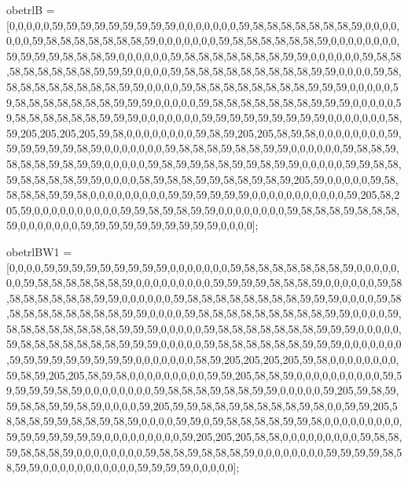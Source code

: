 obetrlB = [0,0,0,0,0,59,59,59,59,59,59,59,59,59,0,0,0,0,0,0,0,59,58,58,58,58,58,58,58,59,0,0,0,0,0,0,0,59,58,58,58,58,58,58,58,59,0,0,0,0,0,0,0,59,58,58,58,58,58,58,59,0,0,0,0,0,0,0,0,59,59,59,59,58,58,58,59,0,0,0,0,0,0,59,58,58,58,58,58,58,58,59,59,0,0,0,0,0,0,59,58,58,58,58,58,58,58,58,59,59,59,0,0,0,0,59,58,58,58,58,58,58,58,58,58,59,59,0,0,0,0,59,58,58,58,58,58,58,58,58,58,59,59,0,0,0,0,59,58,58,58,58,58,58,58,58,59,59,59,0,0,0,0,0,59,58,58,58,58,58,58,58,59,59,59,0,0,0,0,0,59,58,58,58,58,58,58,58,59,59,59,0,0,0,0,0,59,58,58,58,58,58,58,59,59,59,0,0,0,0,0,0,0,59,59,59,59,59,59,59,59,59,0,0,0,0,0,0,0,58,59,205,205,205,205,59,58,0,0,0,0,0,0,0,0,59,58,59,205,205,58,59,58,0,0,0,0,0,0,0,0,59,59,59,59,59,59,58,59,0,0,0,0,0,0,0,59,58,58,58,59,58,58,59,59,0,0,0,0,0,0,59,58,58,59,58,58,58,59,58,59,59,0,0,0,0,0,59,58,59,59,58,58,59,59,58,59,59,0,0,0,0,0,59,59,58,58,59,58,58,58,58,59,59,0,0,0,0,58,59,58,58,59,59,58,58,59,58,59,205,59,0,0,0,0,0,59,58,58,58,58,59,59,58,0,0,0,0,0,0,0,0,0,59,59,59,59,59,59,0,0,0,0,0,0,0,0,0,0,0,59,205,58,205,59,0,0,0,0,0,0,0,0,0,0,59,59,58,59,58,59,59,0,0,0,0,0,0,0,0,59,58,58,58,59,58,58,58,59,0,0,0,0,0,0,0,59,59,59,59,59,59,59,59,59,59,0,0,0,0];

obetrlBW1 = [0,0,0,0,59,59,59,59,59,59,59,59,59,0,0,0,0,0,0,0,59,58,58,58,58,58,58,58,59,0,0,0,0,0,0,0,59,58,58,58,58,58,58,59,0,0,0,0,0,0,0,0,0,59,59,59,59,58,58,58,59,0,0,0,0,0,0,59,58,58,58,58,58,58,58,59,59,0,0,0,0,0,0,59,58,58,58,58,58,58,58,58,59,59,59,0,0,0,0,59,58,58,58,58,58,58,58,58,58,59,59,0,0,0,0,59,58,58,58,58,58,58,58,58,58,59,59,0,0,0,0,59,58,58,58,58,58,58,58,58,59,59,59,0,0,0,0,0,59,58,58,58,58,58,58,58,59,59,59,0,0,0,0,0,59,58,58,58,58,58,58,58,59,59,59,0,0,0,0,0,59,58,58,58,58,58,58,59,59,59,0,0,0,0,0,0,0,59,59,59,59,59,59,59,59,59,0,0,0,0,0,0,0,58,59,205,205,205,205,59,58,0,0,0,0,0,0,0,0,59,58,59,205,205,58,59,58,0,0,0,0,0,0,0,0,0,59,59,205,58,58,59,0,0,0,0,0,0,0,0,0,0,59,59,59,59,59,58,59,0,0,0,0,0,0,0,0,59,58,58,58,59,58,58,59,59,0,0,0,0,0,59,205,59,58,59,59,58,58,59,59,58,59,0,0,0,0,59,205,59,59,58,58,59,58,58,58,58,59,58,0,0,59,59,205,58,58,58,59,59,58,58,59,58,59,0,0,0,0,59,59,0,59,58,58,58,58,59,59,58,0,0,0,0,0,0,0,0,0,59,59,59,59,59,59,59,0,0,0,0,0,0,0,0,0,59,205,205,205,58,58,0,0,0,0,0,0,0,0,0,59,58,58,59,58,58,58,59,0,0,0,0,0,0,0,0,59,58,58,59,58,58,58,59,0,0,0,0,0,0,0,0,59,59,59,59,58,58,59,59,0,0,0,0,0,0,0,0,0,0,0,59,59,59,59,0,0,0,0,0];

